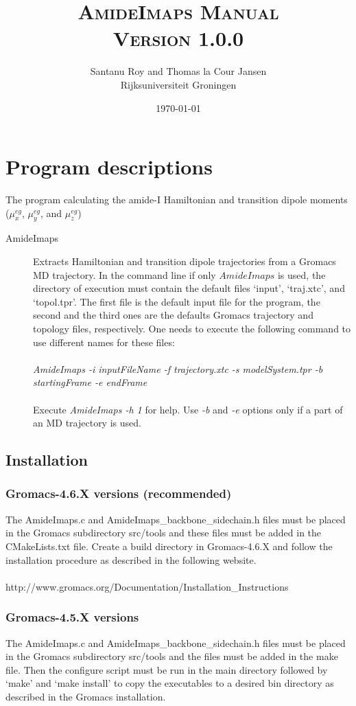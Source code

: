 \documentclass[12pt]{book}
\title{\textsc{AmideImaps Manual\\ Version 1.0.0}}
\author{Santanu Roy and Thomas la Cour Jansen\\ Rijksuniversiteit Groningen}
\date{\today}
\begin{document}
\maketitle

\chapter{Program descriptions}
The program calculating the amide-I Hamiltonian and transition dipole moments ($\mu_{x}^{eg}$, $\mu_{y}^{eg}$, and $\mu_{z}^{eg}$)
\begin{description}
\item [AmideImaps] 
Extracts Hamiltonian and transition dipole trajectories from a Gromacs MD trajectory. In the command line if only $AmideImaps$ is used, the directory of execution must contain the default files 
`input', `traj.xtc', and `topol.tpr'. The first file is the default input file for the program, the second and the third ones are the defaults Gromacs trajectory and topology files, respectively. One needs to execute the following command to use different names for these files:
\\\\
\textit{AmideImaps -i inputFileName -f trajectory.xtc -s modelSystem.tpr -b startingFrame -e endFrame}
\\\\
Execute \textit{AmideImaps -h 1} for help. Use \textit{ -b} and \textit{-e} options only if a part of an MD trajectory is used.  
\end{description}

\section{Installation}
\subsection{Gromacs-4.6.X versions (recommended)} The AmideImaps.c and AmideImaps\_backbone\_sidechain.h files must be placed in the Gromacs subdirectory src/tools and these files must be added in the CMakeLists.txt file. Create a build directory in Gromacs-4.6.X and follow the installation procedure as described in the following website. 
\\\\
http://www.gromacs.org/Documentation/Installation\_Instructions

\subsection{Gromacs-4.5.X versions} The AmideImaps.c and AmideImaps\_backbone\_sidechain.h files must be placed in the Gromacs subdirectory src/tools and the files must be added in the make file. Then the configure script must be run in the main directory followed by `make' and `make install' to copy the executables to a desired bin directory as described in the Gromacs installation.
\end{document}
